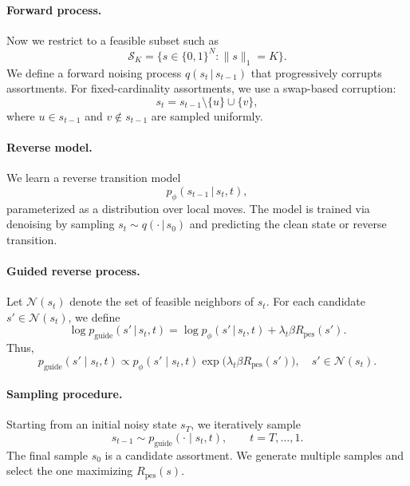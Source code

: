 \documentclass[11pt]{article}
\begin{document}
\paragraph{Forward process.}
Now we restrict to a feasible subset such as
\begin{equation*}
\mathscr{S}_K = \{s \in \{0,1\}^N : \|s\|_1 = K\}.
\end{equation*} 
We define a forward noising process $q(s_t\,|\, s_{t-1})$ that progressively corrupts assortments. For fixed-cardinality assortments, we use a swap-based corruption:
\begin{equation*}
s_t = s_{t-1} \setminus\{u\} \cup \{v\},
\end{equation*}
where $u \in s_{t-1}$ and $v \notin s_{t-1}$ are sampled uniformly.

\paragraph{Reverse model.}
We learn a reverse transition model
\begin{equation*}
p_\phi(s_{t-1}\,|\, s_t, t),
\end{equation*}
parameterized as a distribution over local moves. The model is trained via denoising by sampling $s_t \sim q(\cdot\,|\, s_0)$ and predicting the clean state or reverse transition.

\paragraph{Guided reverse process.}
Let $\mathcal{N}(s_t)$ denote the set of feasible neighbors of $s_t$. For each candidate $s' \in \mathcal{N}(s_t)$, we define
\begin{equation*}
\log p_{\mathrm{guide}}(s'\,|\, s_t, t)=\log p_\phi(s'\,|\, s_t, t)
+
\lambda_t \beta R_{\mathrm{pes}}(s').
\end{equation*}
Thus,
\begin{equation*}
p_{\mathrm{guide}}(s' \mid s_t, t)
\propto
p_\phi(s' \mid s_t, t)
\exp\bigl(\lambda_t \beta R_{\mathrm{pes}}(s')\bigr),
\quad s' \in \mathcal{N}(s_t).
\end{equation*}

\paragraph{Sampling procedure.}
Starting from an initial noisy state $s_T$, we iteratively sample
\begin{equation*}
s_{t-1} \sim p_{\mathrm{guide}}(\cdot \mid s_t, t),
\qquad t = T, \dots, 1.
\end{equation*}
The final sample $s_0$ is a candidate assortment. We generate multiple samples and select the one maximizing $R_{\mathrm{pes}}(s)$.
\end{document}

